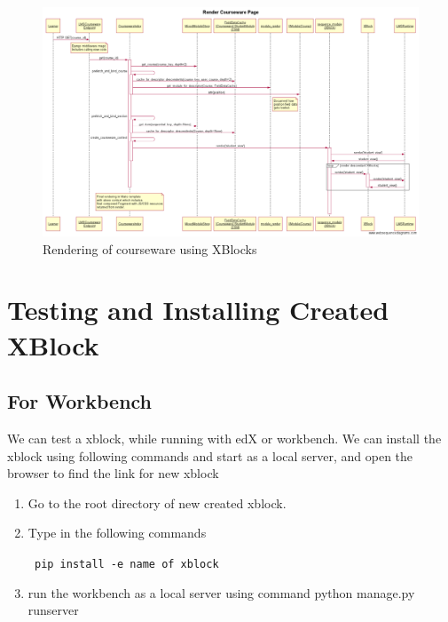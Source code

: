\begin{figure}[!]
	\includegraphics[width=\linewidth]{images/Render_Courseware_Page_Sequence_Diagram.png}
	\caption{Rendering of courseware using XBlocks}
	\label{Fig.1:Sequence diagram}
\end{figure}


\section{Testing and Installing Created XBlock}
\subsection{For Workbench}
We can test a xblock, while running with edX or workbench. We can install the xblock using following
commands and start as a local server, and open the browser to find the link for new xblock
\begin{enumerate}
\item Go to the root directory of new created xblock.
\item Type in the following commands\begin{center}\verb= pip install -e name of xblock=\end{center}
\item run the workbench as a local server using command python manage.py
runserver
\end{enumerate}



